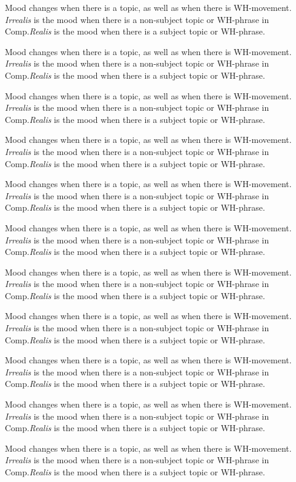 Mood changes when there is a topic, as well as when
there is WH-movement.  \emph{Irrealis} is the mood when
there is a non-subject topic or WH-phrase in Comp.\emph{Realis}
is the mood when there is a subject topic
or WH-phrase.


Mood changes when there is a topic, as well as when
there is WH-movement.  \emph{Irrealis} is the mood when
there is a non-subject topic or WH-phrase in Comp.\emph{Realis}
is the mood when there is a subject topic
or WH-phrase.



Mood changes when there is a topic, as well as when
there is WH-movement.  \emph{Irrealis} is the mood when
there is a non-subject topic or WH-phrase in Comp.\emph{Realis}
is the mood when there is a subject topic
or WH-phrase.



Mood changes when there is a topic, as well as when
there is WH-movement.  \emph{Irrealis} is the mood when
there is a non-subject topic or WH-phrase in Comp.\emph{Realis}
is the mood when there is a subject topic
or WH-phrase.


Mood changes when there is a topic, as well as when
there is WH-movement.  \emph{Irrealis} is the mood when
there is a non-subject topic or WH-phrase in Comp.\emph{Realis}
is the mood when there is a subject topic
or WH-phrase.



Mood changes when there is a topic, as well as when
there is WH-movement.  \emph{Irrealis} is the mood when
there is a non-subject topic or WH-phrase in Comp.\emph{Realis}
is the mood when there is a subject topic
or WH-phrase.

Mood changes when there is a topic, as well as when
there is WH-movement.  \emph{Irrealis} is the mood when
there is a non-subject topic or WH-phrase in Comp.\emph{Realis}
is the mood when there is a subject topic
or WH-phrase.

Mood changes when there is a topic, as well as when
there is WH-movement.  \emph{Irrealis} is the mood when
there is a non-subject topic or WH-phrase in Comp.\emph{Realis}
is the mood when there is a subject topic
or WH-phrase.

Mood changes when there is a topic, as well as when
there is WH-movement.  \emph{Irrealis} is the mood when
there is a non-subject topic or WH-phrase in Comp.\emph{Realis}
is the mood when there is a subject topic
or WH-phrase.

Mood changes when there is a topic, as well as when
there is WH-movement.  \emph{Irrealis} is the mood when
there is a non-subject topic or WH-phrase in Comp.\emph{Realis}
is the mood when there is a subject topic
or WH-phrase.

Mood changes when there is a topic, as well as when
there is WH-movement.  \emph{Irrealis} is the mood when
there is a non-subject topic or WH-phrase in Comp.\emph{Realis}
is the mood when there is a subject topic
or WH-phrase.


